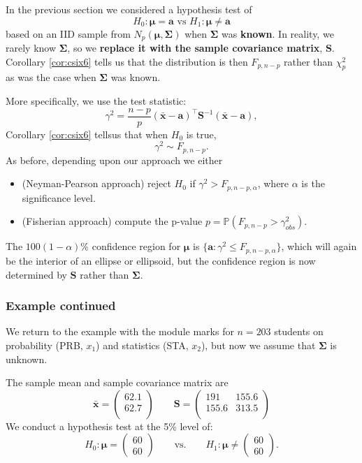 \documentclass[]{book}
\theoremstyle{definition}
\theoremstyle{definition}
\theoremstyle{definition}
\theoremstyle{remark}
\begin{document}
In the previous section we considered a hypothesis test of
\[H_0: \boldsymbol \mu= \boldsymbol a\mbox{ vs } H_1: \boldsymbol \mu\neq \boldsymbol a\] based on an IID sample from \(N_p(\boldsymbol \mu,\boldsymbol \Sigma)\) when \(\boldsymbol \Sigma\) was \textbf{known}. In reality, we rarely know \(\boldsymbol \Sigma\), so we \textbf{replace it with the sample covariance matrix}, \(\boldsymbol S\). Corollary \ref{cor:csix6} tells us that the distribution is then \(F_{p,n-p}\) rather than \(\chi^2_p\) as was the case when \(\boldsymbol \Sigma\) was known.

More specifically, we use the test statistic:
\[\gamma^2 = \frac{n-p}{p} (\bar{\boldsymbol x}-\boldsymbol a)^\top \boldsymbol S^{-1} (\bar{\boldsymbol x}-\boldsymbol a),\]
Corollary \ref{cor:csix6} tellsus that when \(H_0\) is true,
\[\gamma^2 \sim F_{p,n-p}.\]
As before, depending upon our approach we either

\begin{itemize}
\item
  (Neyman-Pearson approach) reject \(H_0\) if \(\gamma^2 > F_{p,n-p,\alpha}\), where \(\alpha\) is the significance level.
\item
  (Fisherian approach) compute the p-value \(p = \mathbb{P}(F_{p,n-p} > \gamma^2_{obs})\).
\end{itemize}

The \(100(1-\alpha)\)\% confidence region for \(\boldsymbol \mu\) is \(\{ \boldsymbol a: \gamma^2 \leq F_{p,n-p,\alpha} \}\), which will again be the interior of an ellipse or ellipsoid, but the confidence region is now determined by \(\boldsymbol S\) rather than \(\boldsymbol \Sigma\).

\hypertarget{example-continued}{%
\subsubsection*{Example continued}\label{example-continued}}

We return to the example with the module marks for \(n=203\) students on probability (PRB, \(x_1\)) and statistics (STA, \(x_2\)), but now we assume that \(\boldsymbol \Sigma\) is unknown.

The sample mean and sample covariance matrix are
\[\bar{\boldsymbol x} = \begin{pmatrix}62.1 \\62.7 \\\end{pmatrix} \qquad \boldsymbol S= \begin{pmatrix}191&155.6 \\155.6&313.5 \\\end{pmatrix}\]
We conduct a hypothesis test at the 5\% level of:
\[H_0: \boldsymbol \mu= \begin{pmatrix} 60 \\ 60 \end{pmatrix} \qquad \text{vs.} \qquad H_1: \boldsymbol \mu\neq \begin{pmatrix} 60 \\ 60 \end{pmatrix}.\]
\end{document}
